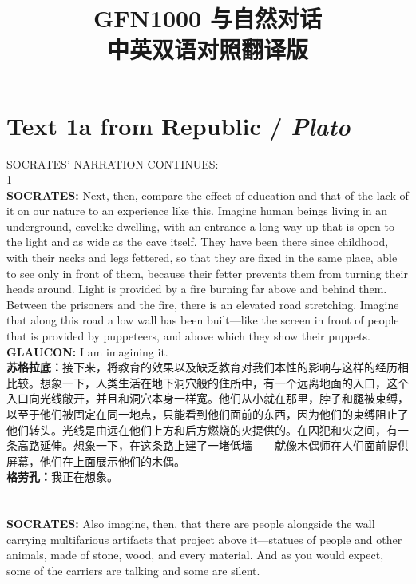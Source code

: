 \documentclass{article}
\begin{document}
\title{\textbf{
GFN1000 与自然对话\\
中英双语对照翻译版
}} %
\date{}
\maketitle %

\setcounter{secnumdepth}{0} %
\tableofcontents
\newpage

\section{Text 1a from Republic / \textit{Plato}}
SOCRATES’ NARRATION CONTINUES:\\
1\\
\textbf{SOCRATES:} Next, then, compare the effect of education and that of the lack of it on our nature to an experience like this. Imagine human beings living in an underground, cavelike dwelling, with an entrance a long way up that is open to the light and as wide as the cave itself. They have been there since childhood, with their necks and legs fettered, so that they are fixed in the same place, able to see only in front of them, because their fetter prevents them from turning their heads around. Light is provided by a fire burning far above and behind them. Between the prisoners and the fire, there is an elevated road stretching. Imagine that along this road a low wall has been built—like the screen in front of people that is provided by puppeteers, and above which they show their puppets.\\
\textbf{GLAUCON:} I am imagining it.\\
\textbf{苏格拉底：}接下来，将教育的效果以及缺乏教育对我们本性的影响与这样的经历相比较。想象一下，人类生活在地下洞穴般的住所中，有一个远离地面的入口，这个入口向光线敞开，并且和洞穴本身一样宽。他们从小就在那里，脖子和腿被束缚，以至于他们被固定在同一地点，只能看到他们面前的东西，因为他们的束缚阻止了他们转头。光线是由远在他们上方和后方燃烧的火提供的。在囚犯和火之间，有一条高路延伸。想象一下，在这条路上建了一堵低墙——就像木偶师在人们面前提供屏幕，他们在上面展示他们的木偶。\\
\textbf{格劳孔：}我正在想象。\\
\\\\
\textbf{SOCRATES:} Also imagine, then, that there are people alongside the wall carrying multifarious artifacts that project above it—statues of people and other animals, made of stone, wood, and every material. And as you would expect, some of the carriers are talking and some are silent.\\
\end{document}
